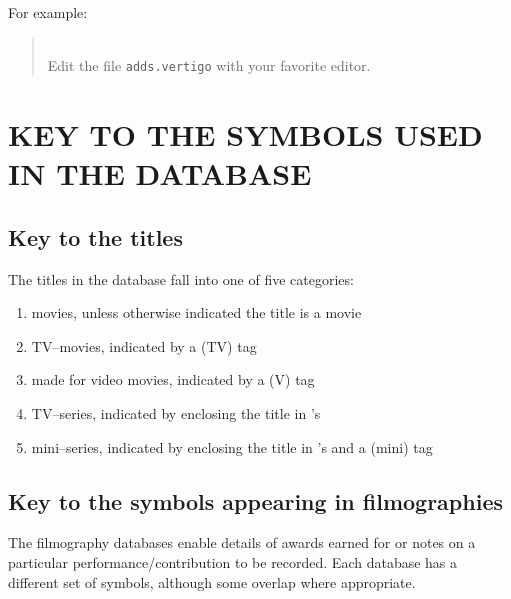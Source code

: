 For example:
\begin{quotation}
\\
Edit the file {\tt adds.vertigo} with your favorite editor.
 
\end{quotation}
\clearpage  
\appendix
\section{KEY TO THE SYMBOLS USED IN THE DATABASE}

\subsection{Key to the titles}
The titles in the database fall into one of five categories:
\begin{enumerate}
\item movies, unless otherwise indicated the title is a movie
\item TV--movies, indicated by a (TV) tag
\item made for video movies, indicated by a (V) tag
\item TV--series, indicated by enclosing the title in 's
\item mini--series, indicated by enclosing the title in 's and a (mini) tag
\end{enumerate}

\newenvironment{Ventry}[1]%
{\begin{list}{}{\renewcommand{\makelabel}[1]{\textsf{##1}\hfil}%
\settowidth{\labelwidth}{\textsf{#1}}%
\leftmargin=\labelwidth \advance \leftmargin by \labelsep}}%
{\end{list}}
\subsection{Key to the symbols appearing in filmographies}

The filmography databases enable details of awards earned for or notes on a 
particular performance/contribution to be recorded. Each database has a 
different set of symbols, although some overlap where appropriate. 

